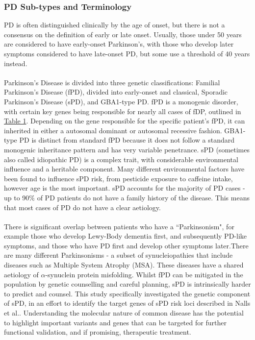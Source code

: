 \documentclass{article}
\begin{document}
\subsubsection{PD Sub-types and Terminology}
\label{subsubsec:PDtypes}
PD is often distinguished clinically by the age of onset, but there is not a consensus on the definition of early or late onset\cite{Riboldi2022AParkinsonism}. Usually, those under 50 years are considered to have early-onset Parkinson's, with those who develop later symptoms considered to have late-onset PD, but some use a threshold of 40 years instead\cite{Ferguson2016Early-onsetStudy}.
\\
\\Parkinson's Disease is divided into three genetic classifications: Familial Parkinson's Disease (fPD), divided into early-onset and classical, Sporadic Parkinson's Disease (sPD), and GBA1-type PD\cite{Tolosa2021ChallengesDisease}. fPD is a monogenic disorder, with certain key genes being responsible for nearly all cases of fDP, outlined in \hyperref[tab:fPDgenes]{Table 1}. Depending on the gene responsible for the specific patient's fPD, it can inherited in either a autosomal dominant or autosomal recessive fashion\cite{Day2021ThePractice}. GBA1-type PD is distinct from standard fPD because it does not follow a standard monogenic inheritance pattern and has very variable penetrance. sPD (sometimes also called idiopathic PD) is a complex trait, with considerable environmental influence and a heritable component\cite{Nalls2019IdentificationStudies}. Many different environmental factors have been found to influence sPD risk\cite{Costa2023ParkinsonsDisorder}, from pesticide exposure to caffeine intake, however age is the most important. sPD accounts for the majority of PD cases - up to 90\% of PD patients do not have a family history of the disease\cite{Inamdar2007ParkinsonsBeyond}. This means that most cases of PD do not have a clear aetiology. 
\\
\\There is significant overlap between patients who have a ``Parkinsonism", for example those who develop Lewy-Body dementia first, and subsequently PD-like symptoms\cite{Jellinger2018DementiaControversies}, and those who have PD first and develop other symptoms later.There are many different Parkinsonisms - a subset of synucleiopathies that include diseases such as Multiple System Atrophy (MSA)\cite{Hayes2019ParkinsonsParkinsonism}. These diseases have a shared aetiology of $\alpha$-synuclein protein misfolding. Whilst fPD can be mitigated in the population by genetic counselling and careful planning, sPD is intrinsically harder to predict and counsel. This study specifically investigated the genetic component of sPD, in an effort to identify the target genes of sPD risk loci described in Nalls et al.\cite{Nalls2019IdentificationStudies}. Understanding the molecular nature of common disease has the potential to highlight important variants and genes that can be targeted for further functional validation, and if promising, therapeutic treatment.
\end{document}
